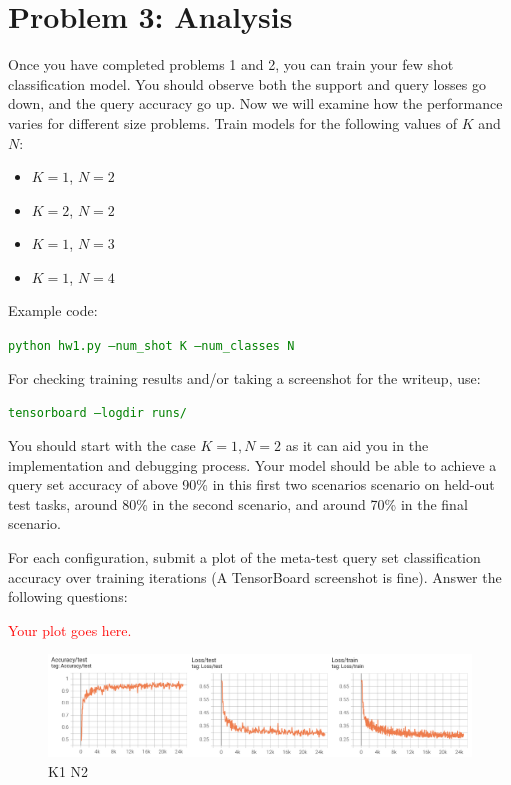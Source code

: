 \documentclass[12pt]{article}
\begin{document}
\section*{Problem 3: Analysis}

Once you have completed problems 1 and 2, you can train your few shot classification model. You should observe both the support and query losses go down, and the query accuracy go up. Now we will examine how the performance varies for different size problems.
Train models for the following values of $K$ and $N$:
\begin{itemize}
    \item $K = 1$, $N=2$ %
    \item $K = 2$, $N=2$ %
    \item $K = 1$, $N=3$ %
    \item $K = 1$, $N=4$ %
\end{itemize}

Example code:

\textcolor{green}{\texttt{python hw1.py --num\_shot K --num\_classes N}}

For checking training results and/or taking a screenshot for the writeup, use:

\textcolor{green}{\texttt{tensorboard --logdir runs/}}

You should start with the case $K=1 , N=2$ as it can aid you in the implementation and debugging process. Your model should be able to achieve a query set accuracy of above 90\% in this first two scenarios scenario on held-out test tasks, around 80\% in the second scenario, and around 70\% in the final scenario.


For each configuration, submit a plot of the meta-test query set classification accuracy over training iterations (A TensorBoard screenshot is fine). Answer the following questions:

\textcolor{red}{Your plot goes here.}

\begin{figure}[h]
    \centering
    \includegraphics[scale=1.5]{figures/report/k1_n2}
    \caption{K1 N2}
\end{figure}
\end{document}
